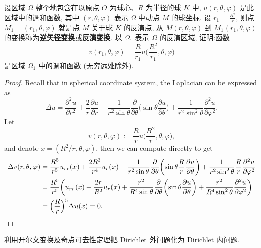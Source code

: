 \begin{exercise}[4]
  设区域 $\varOmega$ 整个地包含在以原点 $O$ 为球心、$R$ 为半径的球 $K$ 中,
  $u(r,\theta,\varphi)$ 是此区域中的调和函数, 其中 $(r,\theta,\varphi)$
  表示 $\varOmega$ 中动点 $M$ 的球坐标. 设 $\displaystyle r_1=\frac{R^2}{r}$, 则点
  $M_1=(r_1,\theta,\varphi)$ 就是点 $M$ 关于球 $K$ 的反演点, 从 $M(r,\theta,\varphi)$
  到 $M_1(r_1,\theta,\varphi)$ 的变换称为\textbf{\heiti 逆矢径变换}或\textbf{\heiti 反演变换}. 以 $\varOmega_1$
  表示 $\varOmega$ 的反演区域, 证明:函数
  \[ v(r_1,\theta,\varphi) = \frac{R}{r_1} u\biggl(\frac{R^2}{r_1},\theta,\varphi\biggr)\]
  是区域 $\varOmega_1$ 中的调和函数 (无穷远处除外).
\end{exercise}

\begin{proof}
  Recall that in spherical coordinate system, the Laplacian can be expressed as
  \[ \Delta u = \frac{\partial^2 u}{\partial r^2} + \frac{2}{r}\frac{\partial u}{\partial r}
      + \frac{1}{r^2\sin\theta} \frac{\partial}{\partial\theta}\biggl(\sin\theta \frac{\partial u}{\partial \theta}\biggr)
      + \frac{1}{r^2\sin^2\theta} \frac{\partial^2 u}{\partial\varphi^2}. \]
  Let
  \[ v(r,\theta,\varphi) := \frac{R}{r} u\biggl(\frac{R^2}{r},\theta,\varphi\biggr), \]
  and denote $x = (R^2/r,\theta,\varphi)$, then we can compute directly to get
  \begin{align*}
    \Delta v(r,\theta,\varphi)
    & = \frac{R^5}{r^5} u_{rr}(x) + \frac{2R^3}{r^4} u_r(x)
        + \frac{1}{r^2\sin\theta} \frac{\partial}{\partial\theta}\biggl(\sin\theta \frac{R}{r} \frac{\partial u}{\partial \theta}\biggr)
        + \frac{1}{r^2\sin^2\theta} \frac{R}{r} \frac{\partial^2 u}{\partial\varphi^2} \\
    & = \frac{R^5}{r^5} \biggl(u_{rr}(x) + \frac{2r}{R^2} u_r(x)
          + \frac{r^2}{R^4\sin\theta} \frac{\partial}{\partial\theta}\biggl(\sin\theta\frac{\partial u}{\partial\theta}\biggr)
          + \frac{r^2}{R^4\sin^2\theta} \frac{\partial^2 u}{\partial \varphi^2}\biggr) \\
    & = \Bigl(\frac{R}{r}\Bigr)^5 \Delta u(x) = 0. \qedhere
  \end{align*}
\end{proof}


\begin{exercise}[5]
  利用开尔文变换及奇点可去性定理把 Dirichlet 外问题化为 Dirichlet 内问题.
\end{exercise}

